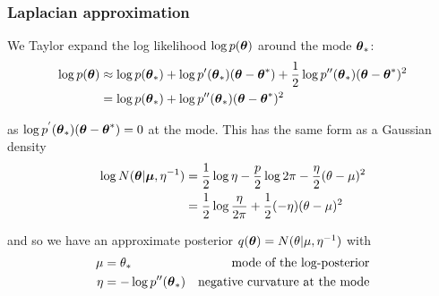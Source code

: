 \documentclass{beamer}
\begin{document}



\begin{frame}
\frametitle{Laplacian approximation}
We Taylor expand the log likelihood $\log{p({\boldsymbol\theta})}$ around the mode
${\boldsymbol \theta}_*$:
\begin{align*}
\log{p({\boldsymbol\theta})} &\approx \log{p({\boldsymbol\theta}_*)} + \log{p'({\boldsymbol\theta}_*)}({\boldsymbol \theta} - {\boldsymbol \theta}^*) + {\frac{1}{2}} \log{p''({\boldsymbol\theta}_*)}({\boldsymbol \theta} - {\boldsymbol \theta}^*)^2 \\
&= \log{p({\boldsymbol\theta}_*)} + \log{p''({\boldsymbol\theta}_*)}({\boldsymbol \theta} - {\boldsymbol \theta}^*)^2
\end{align*}

as $\log{p^{'}({\boldsymbol\theta}_*)}({\boldsymbol \theta} - {\boldsymbol \theta}^*) = 0$ at the mode. This has
the same form as a Gaussian density
\begin{align*}
\log{N({\boldsymbol\theta}|{\boldsymbol\mu}, \eta^{-1})} &= {\frac{1}{2}} \log{\eta} - \frac{p}{2} \log{2 \pi} - \frac{\eta}{2} (\theta-\mu)^2 \\
&= {\frac{1}{2}} \log{\frac{\eta}{2\pi}} + {\frac{1}{2}} (-\eta)(\theta - \mu)^2
\end{align*}

and so we have an approximate posterior $q({\boldsymbol \theta}) = N(\theta|\mu, \eta^{-1})$ with
\begin{align*}
\mu &= \theta_* & \text{mode of the log-posterior}\\
\eta &= -\log{p''({\boldsymbol\theta}_*)} & \text{negative curvature at the mode} \\
\end{align*}
\end{frame}
\end{document}
